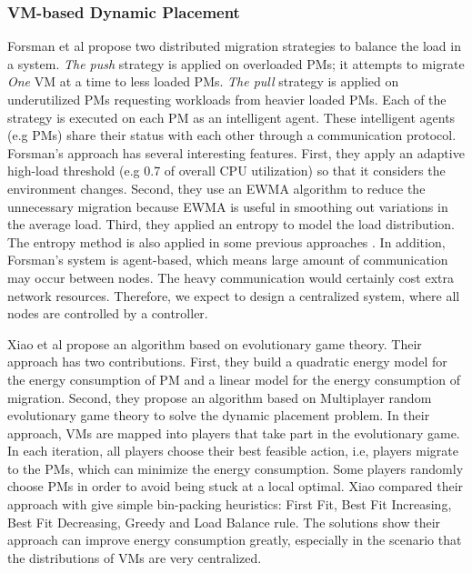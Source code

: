 \subsubsection{VM-based Dynamic Placement}
\label{sec:dynamic}

Forsman et al \cite{Forsman:2015ca} propose two distributed migration strategies to balance the load in a system. \emph{The push} strategy is applied on overloaded PMs; it attempts to migrate \emph{One} VM at a time to less loaded PMs. \emph{The pull} strategy is applied on underutilized PMs requesting workloads from heavier loaded PMs. Each of the strategy is executed on each PM as an intelligent agent. These intelligent agents (e.g PMs) share their status with each other through a communication protocol. Forsman's approach has several interesting features. First, they apply an adaptive high-load threshold (e.g 0.7 of overall CPU utilization) so that it considers the environment changes. Second, they use an EWMA algorithm to reduce the unnecessary migration because EWMA \cite{Holt:2004fs} is useful in smoothing out variations in the average load. Third, they applied an entropy to model the load distribution. The entropy method is also applied in some previous approaches \cite{Qin:2012wu,Kunkle:2008bz}. In addition, Forsman's system is agent-based, which means large amount of communication may occur between nodes. The heavy communication would certainly cost extra network resources. Therefore, we expect to design a centralized system, where all nodes are controlled by a controller. 

Xiao et al  \cite{Xiao:2015ik} propose an algorithm based on evolutionary game theory. Their approach has two contributions. First, they build a quadratic energy model for the energy consumption of PM and a linear model for the energy consumption of migration. Second, they propose an algorithm based on Multiplayer random evolutionary game theory to solve the dynamic placement problem. In their approach, VMs are mapped into players that take part in the evolutionary game. In each iteration, all players choose their best feasible action, i.e, players migrate to the PMs, which can minimize the energy consumption. Some players randomly choose PMs in order to avoid being stuck at a local optimal. Xiao compared their approach with give simple bin-packing heuristics: First Fit, Best Fit Increasing, Best Fit Decreasing, Greedy and Load Balance rule. The solutions show their approach can improve energy consumption greatly, especially in the scenario that the distributions of VMs are very centralized.


